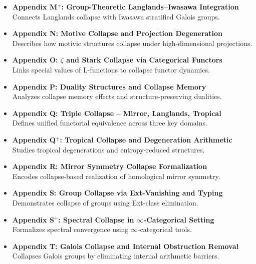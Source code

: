 \documentclass[11pt]{article}
\begin{document}
\begin{itemize}
  \item \textbf{Appendix M$^+$: Group-Theoretic Langlands–Iwasawa Integration} \\
  Connects Langlands collapse with Iwasawa stratified Galois groups.

  \item \textbf{Appendix N: Motive Collapse and Projection Degeneration} \\
  Describes how motivic structures collapse under high-dimensional projections.

  \item \textbf{Appendix O: $\zeta$ and Stark Collapse via Categorical Functors} \\
  Links special values of L-functions to collapse functor dynamics.

  \item \textbf{Appendix P: Duality Structures and Collapse Memory} \\
  Analyzes collapse memory effects and structure-preserving dualities.

  \item \textbf{Appendix Q: Triple Collapse – Mirror, Langlands, Tropical} \\
  Defines unified functorial equivalence across three key domains.

  \item \textbf{Appendix Q$^+$: Tropical Collapse and Degeneration Arithmetic} \\
  Studies tropical degenerations and entropy-reduced structures.

  \item \textbf{Appendix R: Mirror Symmetry Collapse Formalization} \\
  Encodes collapse-based realization of homological mirror symmetry.

  \item \textbf{Appendix S: Group Collapse via Ext-Vanishing and Typing} \\
  Demonstrates collapse of groups using Ext-class elimination.

  \item \textbf{Appendix S$^+$: Spectral Collapse in $\infty$-Categorical Setting} \\
  Formalizes spectral convergence using $\infty$-categorical tools.

  \item \textbf{Appendix T: Galois Collapse and Internal Obstruction Removal} \\
  Collapses Galois groups by eliminating internal arithmetic barriers.


\end{itemize}
\end{document}
